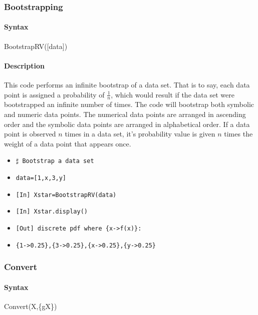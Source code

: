 \documentclass[11pt,epsfig,psfig,doublespace,singlespace]{article}
\begin{document}
\subsubsection{Bootstrapping}
\paragraph{Syntax} BootstrapRV([data])
\paragraph{Description} This code performs an infinite bootstrap of a data set. That is to say, each data point is assigned a probability of $\frac{1}{n}$, which would result if the data set were bootstrapped an infinite number of times. The code will bootstrap both symbolic and numeric data points. The numerical data points are arranged in ascending order and the symbolic data points are arranged in alphabetical order. If a data point is observed $n$ times in a data set, it's probability value is given $n$ times the weight of a data point that appears once. 
\begin{itemize}
\item \texttt{$\sharp$ Bootstrap a data set}
\item \texttt{data=[1,x,3,y]}
\item \texttt{[In] Xstar=BootstrapRV(data)}
\item \texttt{[In] Xstar.display()}
\item \texttt{[Out] discrete pdf where \{x->f(x)\}:}
\item \texttt{\{1->0.25\},\{3->0.25\},\{x->0.25\},\{y->0.25\}}
\end{itemize}
\subsubsection{Convert}
\paragraph{Syntax} Convert(X,\{gX\})
\end{document}
